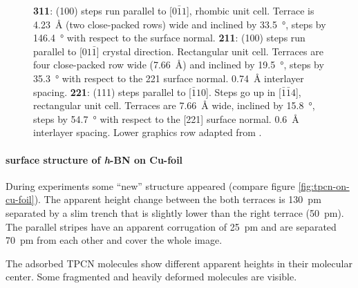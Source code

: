 \begin{figure}
{		\textbf{311}: (100) steps run parallel to [$0 \bar 1 1$], rhombic unit cell. Terrace is \SI{4,23}{\angstrom} (two close-packed rows) wide and inclined by \SI{33,5}{\degree}, steps by \SI{146,4}{\degree} with respect to the surface normal.
		\textbf{211}: (100) steps run parallel to [$0 1 \bar 1$] crystal direction. Rectangular unit cell. Terraces are four close-packed row wide (\SI{7,66}{\angstrom}) and inclined by \SI{19,5}{\degree}, steps by \SI{35,3}{\degree} with respect to the 221 surface normal. \SI{0,74}{\angstrom} interlayer spacing.
		\textbf{221}: (111) steps parallel to [$\bar 1 1 0$]. Steps go up in [$\bar 1 \bar 1 4$], rectangular unit cell. Terraces are \SI{7,66}{\angstrom} wide, inclined by \SI{15,8}{\degree}, steps by \SI{54,7}{\degree} with respect to the [221] surface normal. \SI{0,6}{\angstrom} interlayer spacing. Lower graphics row adapted from \cite{riemann_ionic_2002}.
	}
	\label{tab:step-heights}
\end{figure}

\paragraph{surface structure of \textit{h}-BN on Cu-foil}
During experiments some ``new'' structure appeared (compare figure \ref{fig:tpcn-on-cu-foil}).
The apparent height change between the both terraces is \SI{130}{\pico \meter} separated by a slim trench that is slightly lower than the right terrace (\SI{50}{\pico \meter}). The parallel stripes have an apparent corrugation of \SI{25}{\pico \meter} and are separated \SI{70}{\pico \meter} from each other and cover the whole image. 

The adsorbed TPCN molecules show different apparent heights in their molecular center. Some fragmented and heavily deformed molecules are visible.

